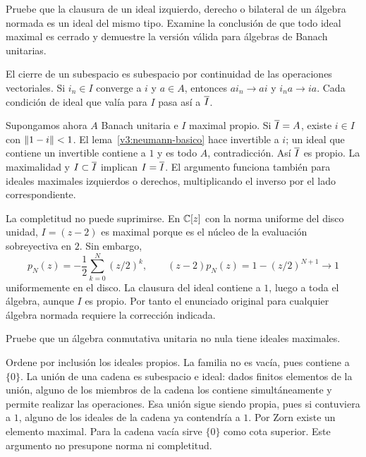 \begin{ejercicio}\label{ej:v3-l20-1}
Pruebe que la clausura de un ideal izquierdo, derecho o bilateral de un álgebra normada es un ideal del mismo tipo. Examine la conclusión de que todo ideal maximal es cerrado y demuestre la versión válida para álgebras de Banach unitarias.
\end{ejercicio}
\begin{solucion}
El cierre de un subespacio es subespacio por continuidad de las operaciones vectoriales. Si $i_n\in I$ converge a $i$ y $a\in A$, entonces $ai_n\to ai$ y $i_na\to ia$. Cada condición de ideal que valía para $I$ pasa así a $\overline{I}$.

Supongamos ahora $A$ Banach unitaria e $I$ maximal propio. Si $\overline{I}=A$, existe $i\in I$ con $\left\lVert1-i\right\rVert<1$. El lema~\ref{v3:neumann-basico} hace invertible a $i$; un ideal que contiene un invertible contiene a $1$ y es todo $A$, contradicción. Así $\overline{I}$ es propio. La maximalidad y $I\subset\overline{I}$ implican $I=\overline{I}$. El argumento funciona también para ideales maximales izquierdos o derechos, multiplicando el inverso por el lado correspondiente.

La completitud no puede suprimirse. En $\mathbb C[z]$ con la norma uniforme del disco unidad, $I=(z-2)$ es maximal porque es el núcleo de la evaluación sobreyectiva en $2$. Sin embargo,
\[
 p_N(z)=-\frac12\sum_{k=0}^N(z/2)^k,
 \qquad (z-2)p_N(z)=1-(z/2)^{N+1}\longrightarrow1
\]
uniformemente en el disco. La clausura del ideal contiene a $1$, luego a toda el álgebra, aunque $I$ es propio. Por tanto el enunciado original para cualquier álgebra normada requiere la corrección indicada.
\end{solucion}

\begin{ejercicio}\label{ej:v3-l20-2}
Pruebe que un álgebra conmutativa unitaria no nula tiene ideales maximales.
\end{ejercicio}
\begin{solucion}
Ordene por inclusión los ideales propios. La familia no es vacía, pues contiene a $\{0\}$. La unión de una cadena es subespacio e ideal: dados finitos elementos de la unión, alguno de los miembros de la cadena los contiene simultáneamente y permite realizar las operaciones. Esa unión sigue siendo propia, pues si contuviera a $1$, alguno de los ideales de la cadena ya contendría a $1$. Por Zorn existe un elemento maximal. Para la cadena vacía sirve $\{0\}$ como cota superior. Este argumento no presupone norma ni completitud.
\end{solucion}

